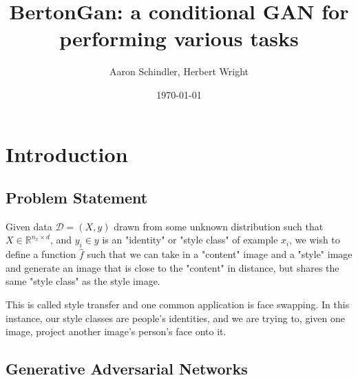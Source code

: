 \documentclass{article}
\title{BertonGan: a conditional GAN for performing various tasks}
\author{ Aaron Schindler, Herbert Wright }
\date{\today}
\begin{document}
\maketitle
\pagebreak

\section{Introduction}

\subsection{Problem Statement}

Given data $\mathcal D = (X, y)$ drawn from some unknown distribution
such that $X \in \mathbb R^{n_x \times d}$, and $y_i \in y$ is an "identity" or "style class"
of example $x_i$, we wish to define a function $\hat{f}$ such that we can take in
a "content" image and a "style" image and generate an image that is close to the "content" in distance,
but shares the same "style class" as the style image.


This is called style transfer and one common application is face swapping.
In this instance, our style classes are people's identities, and we are trying to, given one image,
project another image's person's face onto it.



\subsection{Generative Adversarial Networks}
\end{document}
